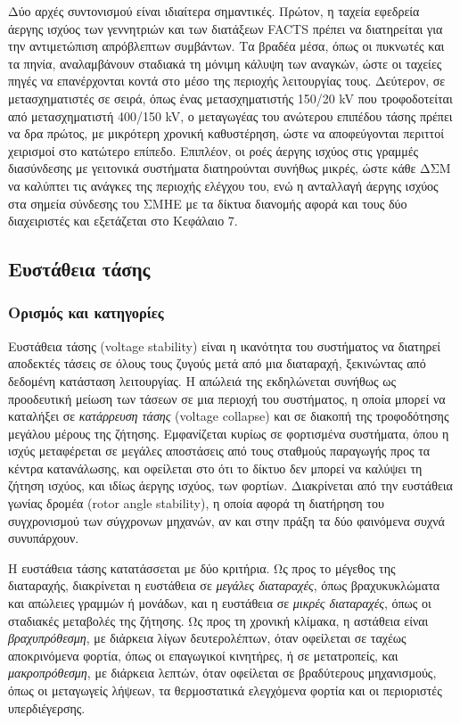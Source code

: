 Δύο αρχές συντονισμού είναι ιδιαίτερα σημαντικές. Πρώτον, η ταχεία εφεδρεία άεργης ισχύος των
γεννητριών και των διατάξεων FACTS πρέπει να διατηρείται για την αντιμετώπιση απρόβλεπτων
συμβάντων. Τα βραδέα μέσα, όπως οι πυκνωτές και τα πηνία, αναλαμβάνουν σταδιακά τη μόνιμη
κάλυψη των αναγκών, ώστε οι ταχείες πηγές να επανέρχονται κοντά στο μέσο της περιοχής
λειτουργίας τους. Δεύτερον, σε μετασχηματιστές σε σειρά, όπως ένας μετασχηματιστής 150/20 kV
που τροφοδοτείται από μετασχηματιστή 400/150 kV, ο μεταγωγέας του ανώτερου επιπέδου τάσης πρέπει
να δρα πρώτος, με μικρότερη χρονική καθυστέρηση, ώστε να αποφεύγονται περιττοί χειρισμοί στο
κατώτερο επίπεδο. Επιπλέον, οι ροές άεργης ισχύος στις γραμμές διασύνδεσης με γειτονικά
συστήματα διατηρούνται συνήθως μικρές, ώστε κάθε ΔΣΜ να καλύπτει τις ανάγκες της περιοχής
ελέγχου του, ενώ η ανταλλαγή άεργης ισχύος στα σημεία σύνδεσης του ΣΜΗΕ με τα
δίκτυα διανομής αφορά και τους δύο διαχειριστές και εξετάζεται στο Κεφάλαιο 7.

\subsection{Ευστάθεια τάσης}
\label{sec:v-stability}

\subsubsection{Ορισμός και κατηγορίες}

Ευστάθεια τάσης (voltage stability) είναι η ικανότητα του συστήματος να διατηρεί αποδεκτές
τάσεις σε όλους τους ζυγούς μετά από μια διαταραχή, ξεκινώντας από δεδομένη κατάσταση
λειτουργίας. Η απώλειά της εκδηλώνεται συνήθως ως προοδευτική μείωση των τάσεων σε μια περιοχή
του συστήματος, η οποία μπορεί να καταλήξει σε \emph{κατάρρευση τάσης} (voltage collapse) και
σε διακοπή της τροφοδότησης μεγάλου μέρους της ζήτησης. Εμφανίζεται κυρίως σε φορτισμένα
συστήματα, όπου η ισχύς μεταφέρεται σε μεγάλες αποστάσεις από τους σταθμούς παραγωγής προς τα
κέντρα κατανάλωσης, και οφείλεται στο ότι το δίκτυο δεν μπορεί να καλύψει τη ζήτηση ισχύος, και
ιδίως άεργης ισχύος, των φορτίων. Διακρίνεται από την ευστάθεια γωνίας δρομέα (rotor angle
stability), η οποία αφορά τη
διατήρηση του συγχρονισμού των σύγχρονων μηχανών, αν και στην πράξη τα δύο φαινόμενα συχνά
συνυπάρχουν.

Η ευστάθεια τάσης κατατάσσεται με δύο κριτήρια. Ως προς το μέγεθος της διαταραχής, διακρίνεται
η ευστάθεια σε \emph{μεγάλες διαταραχές}, όπως βραχυκυκλώματα και απώλειες γραμμών ή μονάδων,
και η ευστάθεια σε \emph{μικρές διαταραχές}, όπως οι σταδιακές μεταβολές της ζήτησης. Ως προς
τη χρονική κλίμακα, η αστάθεια είναι \emph{βραχυπρόθεσμη}, με διάρκεια λίγων δευτερολέπτων,
όταν οφείλεται σε ταχέως αποκρινόμενα φορτία, όπως οι επαγωγικοί κινητήρες, ή σε μετατροπείς,
και \emph{μακροπρόθεσμη}, με διάρκεια λεπτών, όταν οφείλεται σε βραδύτερους μηχανισμούς, όπως
οι μεταγωγείς λήψεων, τα θερμοστατικά ελεγχόμενα φορτία και οι περιοριστές υπερδιέγερσης.

